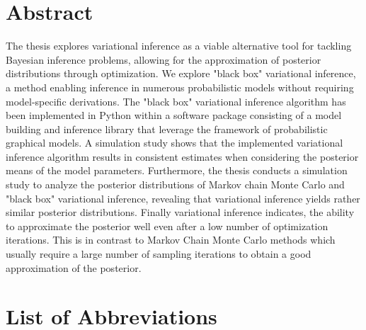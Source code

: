 \clearpage
{}


\section*{Abstract}

The thesis explores variational inference as a viable alternative tool for 
tackling Bayesian inference problems, allowing for the approximation of 
posterior distributions through optimization. We explore "black box" variational inference, 
a method enabling inference in numerous probabilistic models without requiring model-specific derivations.
The "black box" variational inference algorithm has been implemented in Python 
within a software package consisting of a model building and inference library 
that leverage the framework of probabilistic graphical models.
A simulation study shows that the implemented variational inference algorithm results in 
consistent estimates when considering the posterior means of the model parameters. 
Furthermore, the thesis conducts a simulation study to analyze the posterior distributions 
of Markov chain Monte Carlo and "black box" variational inference, 
revealing that variational inference yields rather similar posterior distributions.
Finally variational inference indicates, the ability to 
approximate the posterior well even after a low number of optimization iterations. 
This is in contrast to Markov Chain Monte Carlo methods which usually require a 
large number of sampling iterations to obtain a good approximation of the posterior.

\clearpage

\setcounter{tocdepth}{2}
\tableofcontents
\clearpage

\listoffigures

\listofalgorithms 

\listoftables

\section*{List of Abbreviations}

